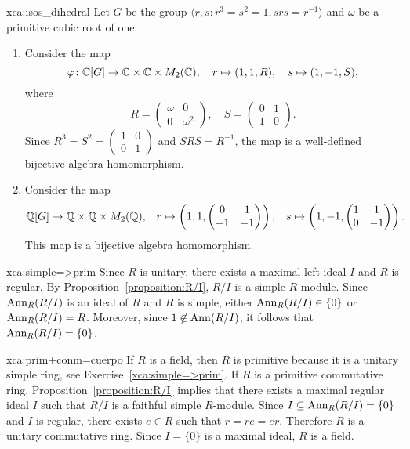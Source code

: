 \begin{sol}{xca:isos_dihedral}
Let $G$ be the group $\langle r,s:r^3=s^2=1,srs=r^{-1}\rangle$ 
and $\omega$ be a primitive cubic root of one. 
\begin{enumerate}
    \item Consider the map 
\[
\varphi\colon \mathbb{C}[G]\to \mathbb{C}\times \mathbb{C}\times M_2(\mathbb{C}),\quad 
r\mapsto (1,1,R),\quad 
s\mapsto (1,-1,S),
\]
where 
\[
R=\begin{pmatrix}
    \omega & 0\\
    0 & \omega^2
\end{pmatrix},\quad 
S=\begin{pmatrix}
    0 & 1 \\
    1 & 0
    \end{pmatrix}. 
\] 
Since $R^3=S^2=\begin{pmatrix}1&0\\0&1\end{pmatrix}$ and $SRS=R^{-1}$, the map 
is a well-defined bijective algebra homomorphism. 
\item Consider the map 
\begin{align*} 
\mathbb{Q}[G]\to\mathbb{Q}\times\mathbb{Q}\times M_2(\mathbb{Q}),&&
r\mapsto \left(1,1,\begin{pmatrix}0&1\\-1&-1\end{pmatrix}\right),&&
s\mapsto \left(1,-1,\begin{pmatrix}1&1\\0&-1\end{pmatrix}\right). 
\end{align*}
This map is a bijective algebra homomorphism. 
\end{enumerate}
\end{sol}


\begin{sol}{xca:simple=>prim} 
	Since $R$ is unitary, there exists a maximal left ideal $I$ and $R$ is regular.
	By Proposition~\ref{proposition:R/I}, $R/I$ is a simple $R$-module. 
	Since $\operatorname{Ann}_R(R/I)$ is an ideal of $R$ and $R$ is simple, either $\operatorname{Ann}_R(R/I)\in\{0\}$ or 
	$\operatorname{Ann}_R(R/I)=R$. Moreover, since 
	$1\not\in\operatorname{Ann}(R/I)$, it follows that 
	$\operatorname{Ann}_R(R/I)=\{0\}$. 
\end{sol}

\begin{sol}{xca:prim+conm=cuerpo}
	If $R$ is a field, then $R$ is primitive because it is a unitary simple ring, see  
	Exercise~\ref{xca:simple=>prim}. If $R$ is a primitive commutative ring, Proposition~\ref{proposition:R/I} implies that there exists a maximal regular ideal $I$
	such that  
	$R/I$ is a faithful simple $R$-module. 
	Since $I\subseteq \operatorname{Ann}_R(R/I)=\{0\}$ and $I$ is regular, there exists $e\in R$ such that 
	$r=re=er$. Therefore $R$ is a unitary commutative ring. Since $I=\{0\}$ is a maximal ideal, 
	$R$ is a field. 
\end{sol}

